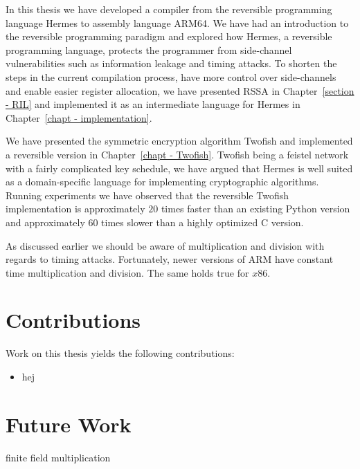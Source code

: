 In this thesis we have developed a compiler from the reversible programming language Hermes to assembly language ARM64.
We have had an introduction to the reversible programming paradigm and explored how Hermes, a reversible programming language, protects the programmer from side-channel vulnerabilities such as information leakage and timing attacks.
To shorten the steps in the current compilation process, have more control over side-channels and enable easier register allocation, we have presented RSSA in Chapter~\ref{section - RIL} and implemented it as an intermediate language for Hermes in Chapter~\ref{chapt - implementation}.

We have presented the symmetric encryption algorithm Twofish and implemented a reversible version in Chapter~\ref{chapt - Twofish}.
Twofish being a feistel network with a fairly complicated key schedule, we have argued that Hermes is well suited as a domain-specific language for implementing cryptographic algorithms.
Running experiments we have observed that the reversible Twofish implementation is approximately $20$ times faster than an existing Python version and approximately $60$ times slower than a highly optimized C version.

As discussed earlier we should be aware of multiplication and division with regards to timing attacks.
Fortunately, newer versions of ARM have constant time multiplication and division.
The same holds true for $x86$.

\section{Contributions}
Work on this thesis yields the following contributions:
\begin{itemize}
  \item hej
\end{itemize}

\section{Future Work}
finite field multiplication

